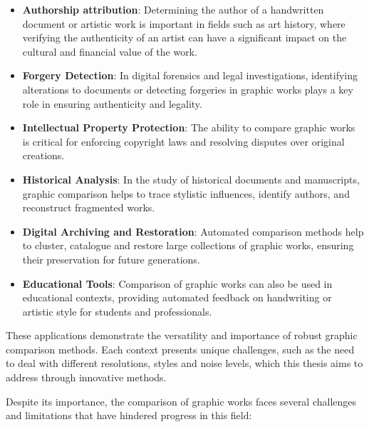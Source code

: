 \begin{toReview}
		\begin{itemize}
			\item \textbf{Authorship attribution}: Determining the author of a handwritten document or artistic work is important in fields such as art history, where verifying the authenticity of an artist can have a significant impact on the cultural and financial value of the work.
			\item \textbf{Forgery Detection}: In digital forensics and legal investigations, identifying alterations to documents or detecting forgeries in graphic works plays a key role in ensuring authenticity and legality.
			\item \textbf{Intellectual Property Protection}: The ability to compare graphic works is critical for enforcing copyright laws and resolving disputes over original creations.
			\item \textbf{Historical Analysis}: In the study of historical documents and manuscripts, graphic comparison helps to trace stylistic influences, identify authors, and reconstruct fragmented works.
			\item \textbf{Digital Archiving and Restoration}: Automated comparison methods help to cluster, catalogue and restore large collections of graphic works, ensuring their preservation for future generations.
			\item \textbf{Educational Tools}: Comparison of graphic works can also be used in educational contexts, providing automated feedback on handwriting or artistic style for students and professionals.
		\end{itemize}

		\noindent These applications demonstrate the versatility and importance of robust graphic comparison methods. Each context presents unique challenges, such as the need to deal with different resolutions, styles and noise levels, which this thesis aims to address through innovative methods.

		\bigskip
		\noindent Despite its importance, the comparison of graphic works faces several challenges and limitations that have hindered progress in this field:


\end{toReview}
